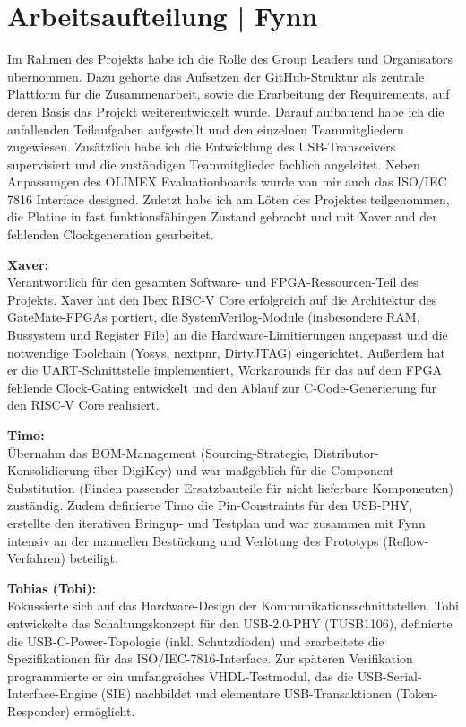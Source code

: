 \documentclass[a4paper,11pt]{article}
\begin{document}
\section{Arbeitsaufteilung | Fynn}
Im Rahmen des Projekts habe ich die Rolle des Group Leaders und Organisators übernommen.
Dazu gehörte das Aufsetzen der GitHub-Struktur als zentrale Plattform für die Zusammenarbeit,
sowie die Erarbeitung der Requirements,
auf deren Basis das Projekt weiterentwickelt wurde.
Darauf aufbauend habe ich die anfallenden Teilaufgaben aufgestellt und den einzelnen Teammitgliedern zugewiesen.
Zusätzlich habe ich die Entwicklung des USB-Transceivers supervisiert und die zuständigen Teammitglieder fachlich angeleitet.
Neben Anpassungen des OLIMEX Evaluationboards wurde von mir auch das ISO/IEC 7816 Interface designed.
Zuletzt habe ich am Löten des Projektes teilgenommen, die Platine in fast funktionsfähingen Zustand gebracht
und mit Xaver and der fehlenden Clockgeneration gearbeitet.
\vspace{\baselineskip}

\textbf{Xaver:}\\
Verantwortlich für den gesamten Software- und FPGA-Ressourcen-Teil des Projekts. Xaver hat den Ibex RISC-V Core erfolgreich auf die Architektur des GateMate-FPGAs portiert, die SystemVerilog-Module (insbesondere RAM, Bussystem und Register File) an die Hardware-Limitierungen angepasst und die notwendige Toolchain (Yosys, nextpnr, DirtyJTAG) eingerichtet. Außerdem hat er die UART-Schnittstelle implementiert, Workarounds für das auf dem FPGA fehlende Clock-Gating entwickelt und den Ablauf zur C-Code-Generierung für den RISC-V Core realisiert.

\vspace{\baselineskip}
\textbf{Timo:}\\
Übernahm das BOM-Management (Sourcing-Strategie, Distributor-Konsolidierung über DigiKey) und war maßgeblich für die Component Substitution (Finden passender Ersatzbauteile für nicht lieferbare Komponenten) zuständig. Zudem definierte Timo die Pin-Constraints für den USB-PHY, erstellte den iterativen Bringup- und Testplan und war zusammen mit Fynn intensiv an der manuellen Bestückung und Verlötung des Prototyps (Reflow-Verfahren) beteiligt.

\vspace{\baselineskip}
\textbf{Tobias (Tobi):}\\
Fokussierte sich auf das Hardware-Design der Kommunikationsschnittstellen. Tobi entwickelte das Schaltungskonzept für den USB-2.0-PHY (TUSB1106), definierte die USB-C-Power-Topologie (inkl. Schutzdioden) und erarbeitete die Spezifikationen für das ISO/IEC-7816-Interface. Zur späteren Verifikation programmierte er ein umfangreiches VHDL-Testmodul, das die USB-Serial-Interface-Engine (SIE) nachbildet und elementare USB-Transaktionen (Token-Responder) ermöglicht.
\end{document}
